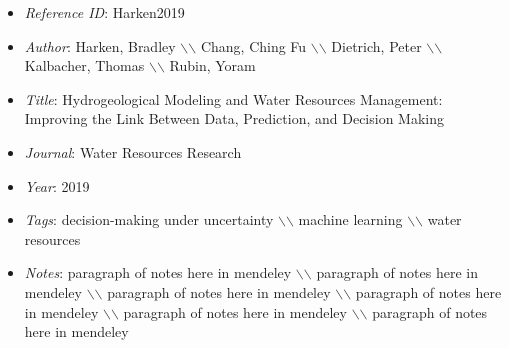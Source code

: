 \documentclass[11pt]{article}
\begin{document}
\noindent\citep{Harken2019} 
\begin{itemize} 
\item{\textit{Reference ID}:  Harken2019} 

\item{\textit{Author}:  Harken, Bradley $\backslash$$\backslash$ Chang, Ching Fu $\backslash$$\backslash$ Dietrich, Peter $\backslash$$\backslash$ Kalbacher, Thomas $\backslash$$\backslash$ Rubin, Yoram} 

\item{\textit{Title}:  Hydrogeological Modeling and Water Resources Management: Improving the Link Between Data, Prediction, and Decision Making} 

\item{\textit{Journal}:  Water Resources Research} 

\item{\textit{Year}:  2019} 

\item{\textit{Tags}:  decision-making under uncertainty $\backslash$$\backslash$ machine learning $\backslash$$\backslash$ water resources} 

\item{\textit{Notes}:  paragraph of notes here in mendeley $\backslash$$\backslash$ paragraph of notes here in mendeley $\backslash$$\backslash$ paragraph of notes here in mendeley $\backslash$$\backslash$ paragraph of notes here in mendeley $\backslash$$\backslash$ paragraph of notes here in mendeley $\backslash$$\backslash$ paragraph of notes here in mendeley} 

\end{itemize}\medskip
\end{document}
